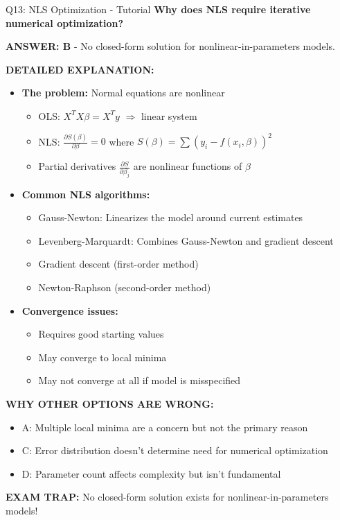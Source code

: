 \documentclass[8pt]{beamer}
\begin{document}
	\begin{frame}{Q13: NLS Optimization - Tutorial}
		\fontsize{6.5}{7.5}\selectfont
		\textbf{Why does NLS require iterative numerical optimization?}
		
		\vspace{0.05cm}
		\textcolor{myblue}{\textbf{ANSWER: B}} - No closed-form solution for nonlinear-in-parameters models.
		
		\vspace{0.05cm}
		\textbf{DETAILED EXPLANATION:}
		\begin{itemize}
			\item \textbf{The problem:} Normal equations are nonlinear
			\begin{itemize}
				\item OLS: $X^TX\beta = X^Ty$ $\Rightarrow$ linear system
				\item NLS: $\frac{\partial S(\beta)}{\partial \beta} = 0$ where $S(\beta) = \sum (y_i - f(x_i, \beta))^2$
				\item Partial derivatives $\frac{\partial S}{\partial \beta_j}$ are nonlinear functions of $\beta$
			\end{itemize}
			\item \textbf{Common NLS algorithms:}
			\begin{itemize}
				\item Gauss-Newton: Linearizes the model around current estimates
				\item Levenberg-Marquardt: Combines Gauss-Newton and gradient descent
				\item Gradient descent (first-order method)
				\item Newton-Raphson (second-order method)
			\end{itemize}
			\item \textbf{Convergence issues:}
			\begin{itemize}
				\item Requires good starting values
				\item May converge to local minima
				\item May not converge at all if model is misspecified
			\end{itemize}
		\end{itemize}
		
		\vspace{0.05cm}
		\textcolor{myred}{\textbf{WHY OTHER OPTIONS ARE WRONG:}}
		\begin{itemize}
			\item \textcolor{myred}{A:} Multiple local minima are a concern but not the primary reason
			\item \textcolor{myred}{C:} Error distribution doesn't determine need for numerical optimization
			\item \textcolor{myred}{D:} Parameter count affects complexity but isn't fundamental
		\end{itemize}
		
		\textcolor{myred}{\textbf{EXAM TRAP:}} No closed-form solution exists for \textcolor{myblue}{nonlinear-in-parameters} models!
	\end{frame}
	
\end{document}
